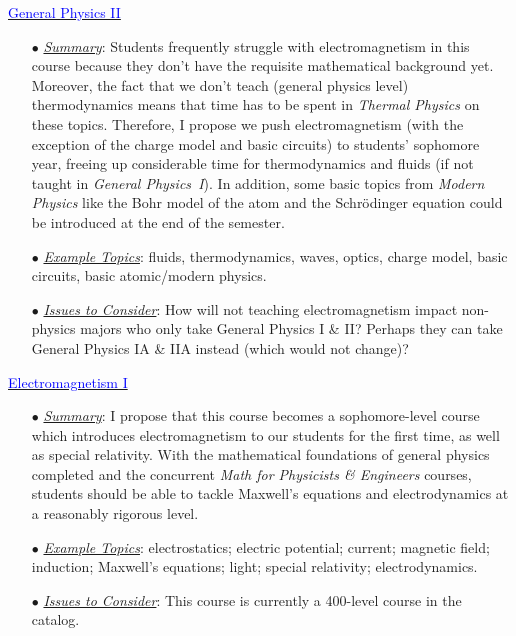 \documentclass[12pt,preprint]{aastex}
\newcommand{\blue}[1]{\textcolor{blue}{#1}}
\begin{document}
\begin{itemize*}
\item{\underline{\blue{General Physics II}}
  \begin{itemize}
    \item[$\bullet$]{\underline{\em Summary}: Students frequently struggle with
      electromagnetism in this course because they don't have the requisite
      mathematical background yet.  Moreover, the fact that we don't teach
      (general physics level) thermodynamics means that time has to be spent in
      {\em Thermal Physics} on these topics.  Therefore, I propose we push
      electromagnetism (with the exception of the charge model and basic
      circuits) to students' sophomore year, freeing up considerable time for
      thermodynamics and fluids (if not taught in {\em General Physics~I}).  In
      addition, some basic topics from {\em Modern Physics} like the Bohr model
      of the atom and the Schr\"{o}dinger equation could be introduced at the
      end of the semester.}
    \item[$\bullet$]{\underline{\em Example Topics}: fluids, thermodynamics,
      waves, optics, charge model, basic circuits, basic atomic/modern physics.}
    \item[$\bullet$]{\underline{\em Issues to Consider}: How will not teaching
      electromagnetism impact non-physics majors who only take General Physics I
      \& II?  Perhaps they can take General Physics IA \& IIA instead (which
      would not change)?}
  \end{itemize}
}
  
\item{\underline{\blue{Electromagnetism I}}
  \begin{itemize}
    \item[$\bullet$]{\underline{\em Summary}: I propose that this course becomes
      a sophomore-level course which introduces electromagnetism to our students
      for the first time, as well as special relativity.  With the mathematical
      foundations of general physics completed and the concurrent {\em Math for
        Physicists \& Engineers} courses, students should be able to tackle
      Maxwell's equations and electrodynamics at a reasonably rigorous level.}
    \item[$\bullet$]{\underline{\em Example Topics}: electrostatics; electric
      potential; current; magnetic field; induction; Maxwell's equations; light;
      special relativity; electrodynamics.}
    \item[$\bullet$]{\underline{\em Issues to Consider}: This course is
      currently a 400-level course in the catalog.}
  \end{itemize}
}


\end{itemize*}
\end{document}
